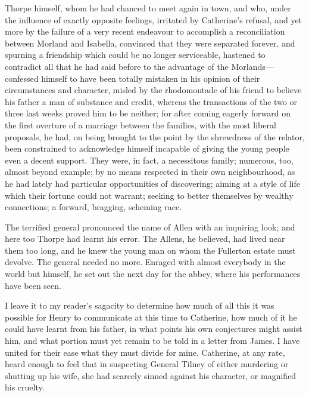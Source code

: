 Thorpe himself, whom he had chanced to meet again in town, and who, under the influence of exactly opposite feelings, irritated by Catherine's refusal, and yet more by the failure of a very recent endeavour to accomplish a reconciliation between Morland and Isabella, convinced that they were separated forever, and spurning a friendship which could be no longer serviceable, hastened to contradict all that he had said before to the advantage of the Morlands---confessed himself to have been totally mistaken in his opinion of their circumstances and character, misled by the rhodomontade of his friend to believe his father a man of substance and credit, whereas the transactions of the two or three last weeks proved him to be neither; for after coming eagerly forward on the first overture of a marriage between the families, with the most liberal proposals, he had, on being brought to the point by the shrewdness of the relator, been constrained to acknowledge himself incapable of giving the young people even a decent support. They were, in fact, a necessitous family; numerous, too, almost beyond example; by no means respected in their own neighbourhood, as he had lately had particular opportunities of discovering; aiming at a style of life which their fortune could not warrant; seeking to better themselves by wealthy connections; a forward, bragging, scheming race.

The terrified general pronounced the name of Allen with an inquiring look; and here too Thorpe had learnt his error. The Allens, he believed, had lived near them too long, and he knew the young man on whom the Fullerton estate must devolve. The general needed no more. Enraged with almost everybody in the world but himself, he set out the next day for the abbey, where his performances have been seen.

I leave it to my reader's sagacity to determine how much of all this it was possible for Henry to communicate at this time to Catherine, how much of it he could have learnt from his father, in what points his own conjectures might assist him, and what portion must yet remain to be told in a letter from James. I have united for their ease what they must divide for mine. Catherine, at any rate, heard enough to feel that in suspecting General Tilney of either murdering or shutting up his wife, she had scarcely sinned against his character, or magnified his cruelty.

